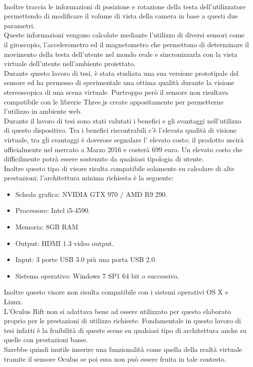 \\
Inoltre traccia le informazioni di posizione e rotazione della testa dell’utilizzatore permettendo di modificare il volume di vista della camera in base a questi due parametri.
\\
Queste informazioni vengono calcolate mediante l’utilizzo di diversi sensori come il giroscopio, l’accelerometro ed il magnetometro che permettono di determinare il movimento della testa dell’utente nel mondo reale e sincronizzarla con la vista virtuale dell’utente nell’ambiente proiettato.
\\
Durante questo lavoro di tesi, è stata studiata una sua versione prototipale del sensore ed ha permesso di sperimentale una ottima qualità durante la visione stereoscopica di una scena virtuale. Purtroppo però il sensore non risultava compatibile con le librerie Three.js create appositamente per permetterne l'utilizzo in ambiente web.
\\
Durante il lavoro di tesi sono stati valutati i benefici e gli svantaggi nell’utilizzo di questo dispositivo. Tra i benefici riscontrabili c’è l’elevata qualità di visione virtuale, tra gli svantaggi è doverose segnalare l’ elevato costo; il prodotto uscirà ufficialmente nel mercato a Marzo 2016 e costerà 699 euro.
Un elevato costo che difficilmente potrà essere sostenuto da qualsiasi tipologia di utente.
\\
Inoltre questo tipo di visore risulta compatibile solamente su calcolare di alte prestazioni; l’architettura minima richiesta è la seguente:
\begin{itemize}
\item Scheda grafica: NVIDIA GTX 970 / AMD R9 290.
\item Processore: Intel i5-4590.
\item Memoria: 8GB RAM
\item Output: HDMI 1.3 video output.
\item Input: 3 porte USB 3.0 più una porta USB 2.0.
\item Sistema operativo: Windows 7 SP1 64 bit o successivo.
\end{itemize}
Inoltre questo visore non risulta compatibile con i sistemi operativi OS X e Linux.
\\
L’Oculus Rift non si adattava bene ad essere utilizzato per questo elaborato proprio per le prestazioni di utilizzo richieste. Fondamentale in questo lavoro di tesi infatti è la fruibilità di queste scene su qualsiasi tipo di architettura anche su quelle con prestazioni basse.
\\
Sarebbe quindi inutile inserire una funzionalità come quella della realtà virtuale tramite il sensore Oculus se poi  essa non può essere fruita in tale contesto.
\\


